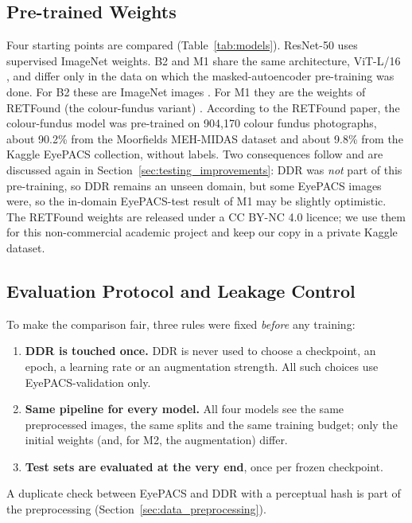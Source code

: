 \subsection{Pre-trained Weights}
\label{subsec:weights}

Four starting points are compared (Table~\ref{tab:models}). ResNet-50 \cite{resnet2016} uses supervised ImageNet \cite{imagenet2009} weights. B2 and M1 share the same architecture, ViT-L/16 \cite{vit2021}, and differ only in the data on which the masked-autoencoder pre-training was done. For B2 these are ImageNet images \cite{mae2022}. For M1 they are the weights of RETFound (the colour-fundus variant) \cite{retfound2023}. According to the RETFound paper, the colour-fundus model was pre-trained on 904{,}170 colour fundus photographs, about 90.2\% from the Moorfields MEH-MIDAS dataset and about 9.8\% from the Kaggle EyePACS collection, without labels. Two consequences follow and are discussed again in Section~\ref{sec:testing_improvements}: DDR was \emph{not} part of this pre-training, so DDR remains an unseen domain, but some EyePACS images were, so the in-domain EyePACS-test result of M1 may be slightly optimistic. The RETFound weights are released under a CC BY-NC 4.0 licence; we use them for this non-commercial academic project and keep our copy in a private Kaggle dataset.

\subsection{Evaluation Protocol and Leakage Control}
\label{subsec:protocol}

To make the comparison fair, three rules were fixed \emph{before} any training:

\begin{enumerate}[leftmargin=1.8em]
    \item \textbf{DDR is touched once.} DDR is never used to choose a checkpoint, an epoch, a learning rate or an augmentation strength. All such choices use EyePACS-validation only.
    \item \textbf{Same pipeline for every model.} All four models see the same preprocessed images, the same splits and the same training budget; only the initial weights (and, for M2, the augmentation) differ.
    \item \textbf{Test sets are evaluated at the very end}, once per frozen checkpoint.
\end{enumerate}

A duplicate check between EyePACS and DDR with a perceptual hash is part of the preprocessing (Section~\ref{sec:data_preprocessing}).


